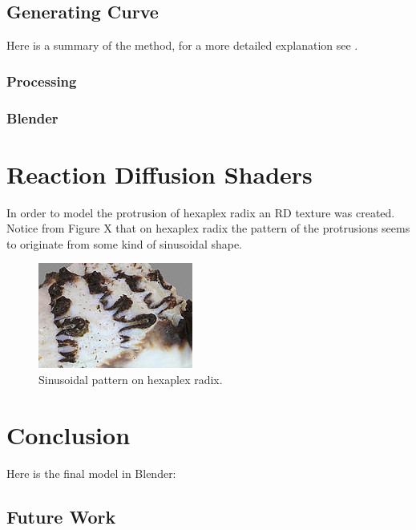 \documentclass[a4paper]{article}
\begin{document}
\pagebreak

\subsection{Generating Curve} 

Here is a summary of the method, for a more detailed explanation see \cite{JORGEPICADO}.

\subsubsection{Processing}

\subsubsection{Blender}

\section{Reaction Diffusion Shaders}

In order to model the protrusion of hexaplex radix an RD texture was created. Notice from Figure X that on hexaplex radix the pattern of the protrusions seems to originate from some kind of sinusoidal shape.

\begin{figure}[h]
	\centering\includegraphics[scale=1.0]{./img/hexaplex_radix_sine.jpg}
	\caption{Sinusoidal pattern on hexaplex radix.}
	\label{hexaplex-sine} %
\end{figure}




\section{Conclusion}

Here is the final model in Blender:

\subsection{Future Work}





\end{document}
